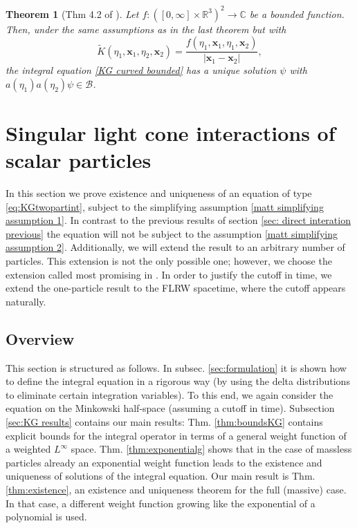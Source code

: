 \documentclass[b5paper,draft,openbib,12pt]{memoir}
\newtheorem{Thm}[Def]{Theorem}
\newcommand{\vx}{\mathbf{x}}
\begin{document}
\begin{Thm}[Thm 4.2 of \cite{lienertcurved}]
  Let \(f:([0,\infty]\times \mathbb{R}^3)^2\rightarrow \mathbb{C}\) 
  be a bounded function. Then, under the same assumptions as in 
  the last theorem but with 
  \begin{equation}
  \tilde{K}(\eta_1,\vx_1,\eta_2,\vx_2)=\frac{f(\eta_1,\vx_1,\eta_1,\vx_2)}{|\vx_1-\vx_2|},
  \end{equation}
the integral equation \eqref{KG curved bounded} has a unique solution
\(\psi\) with 
\(a(\eta_1)a(\eta_2)\psi\in \mathcal{B}\). 
\end{Thm}


\section{Singular light cone interactions of scalar particles}\label{sec:KG lightcones}
In this section we prove existence and uniqueness
of an equation of type \eqref{eq:KGtwopartint},
subject to the simplifying assumption 
\ref{matt simplifying assumption 1}. In contrast to 
the previous results of section \ref{sec: direct interation previous} 
the equation will not be subject to the assumption
\ref{matt simplifying assumption 2}. Additionally, we will extend the 
result to an arbitrary number of particles. This extension 
is not the only possible one; however, we choose the 
extension called most promising in \cite{direct_interaction_quantum}.
In order to justify the cutoff in time, we extend the one-particle 
result to the FLRW spacetime, where the cutoff appears naturally.


\subsection{Overview}

This section is structured as follows. In subsec. \ref{sec:formulation} 
it is shown how to define the integral equation in a rigorous way 
(by using the delta distributions to eliminate certain integration 
variables). To this end, we again consider the equation on the 
Minkowski half-space (assuming a cutoff in time). Subsection 
\ref{sec:KG results} contains our main results: Thm. \ref{thm:boundsKG} 
contains explicit bounds for the integral operator in terms of a 
general weight function of a weighted $L^\infty$ space. Thm. 
\ref{thm:exponentialg} shows that in the case of massless particles 
already an exponential weight function leads to the existence and 
uniqueness of solutions of the integral equation. Our main result 
is Thm. \ref{thm:existence}, an existence and uniqueness theorem 
for the full (massive) case. In that case, a different weight 
function growing like the exponential of a polynomial is used. 
\end{document}
